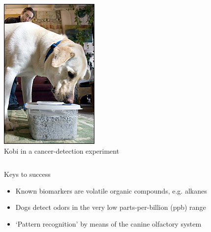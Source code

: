 \documentclass{beamer}              %
\begin{document}
\begin{frame}
\begin{columns}
\includegraphics[width=.9\linewidth]{images/dog.jpg} \\
{\tiny Kobi in a cancer-detection experiment}
\end{columns}

Keys to success
\begin{itemize}
  \item Known biomarkers are volatile organic compounds, e.g. alkanes 
  \item Dogs detect odors in the very low parts-per-billion (ppb) range
  \item `Pattern recognition' by means of the canine olfactory system
\end{itemize}  

\end{frame}
\end{document}

